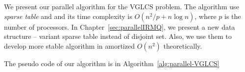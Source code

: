 We present our parallel algorithm for the VGLCS problem.  The algorithm
use {\em sparse table} and and its time complexity is $O(n^2 / p + n
\log n)$, where $p$ is the number of processors.  In
Chapter~\ref{sec:parallelIRMQ}, we present a new data structure --
variant sparse table instead of disjoint set.  Also, we use them to
develop more stable algorithm in amortized $O(n^2)$ theoretically.


The pseudo code of our algorithm is in Algorithm~\ref{alg:parallel-VGLCS}

\iffalse 稀疏表是我們認為最好的替代方案，其整合後為 VGLCS 平行算法
\ref{alg:parallel-VGLCS}，算法的時間複雜度為 $O(n^2 / p + n \log n)$，
其中 $p$ 為處理器個數。在後續的章節，我們將提出新的數據結構取代并查集操
作，且能在平行算法達到理想複雜度 $O(n^2 / p + n \log n)$。\fi


